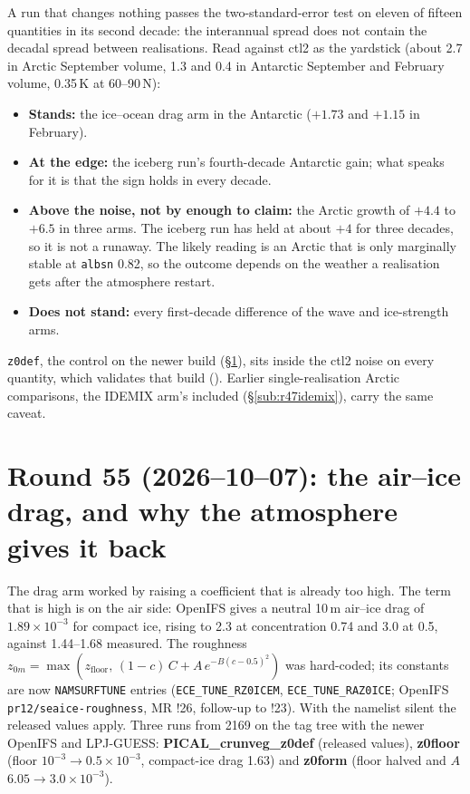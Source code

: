 \documentclass[10pt]{article}
\begin{document}
A run that changes nothing passes the two-standard-error test on eleven of fifteen quantities in its second decade: the interannual spread
does not contain the decadal spread between realisations. Read against ctl2 as the yardstick (about 2.7
in Arctic September volume, 1.3 and 0.4 in Antarctic September and February volume, 0.35\,K at
60--90\,N):

\begin{itemize}\itemsep2pt
\item \textbf{Stands:} the ice--ocean drag arm in the Antarctic ($+1.73$ and $+1.15$ in February).
\item \textbf{At the edge:} the iceberg run's fourth-decade Antarctic gain; what speaks for it is that
the sign holds in every decade.
\item \textbf{Above the noise, not by enough to claim:} the Arctic growth of $+4.4$ to $+6.5$ in three
arms. The iceberg run has held at about $+4$ for three decades, so it is not a runaway. The likely
reading is an Arctic that is only marginally stable at \texttt{albsn} 0.82, so the outcome depends on
the weather a realisation gets after the atmosphere restart.
\item \textbf{Does not stand:} every first-decade difference of the wave and ice-strength arms.
\end{itemize}

\noindent \texttt{z0def}, the control on the newer build (\S\ref{sec:round55}), sits inside the ctl2
noise on every quantity, which validates that build (). Earlier
single-realisation Arctic comparisons, the IDEMIX arm's included (\S\ref{sub:r47idemix}), carry the same
caveat.

\section{Round 55 (2026--10--07): the air--ice drag, and why the atmosphere gives it back}\label{sec:round55}

The drag arm worked by raising a coefficient that is already too high. The term that is high is on the
air side: OpenIFS gives a neutral 10\,m air--ice drag of $1.89\times10^{-3}$ for compact ice, rising to
2.3 at concentration 0.74 and 3.0 at 0.5, against 1.44--1.68 measured. The roughness
$z_{0m}=\max(z_\mathrm{floor},\,(1-c)\,C+A\,e^{-B(c-0.5)^2})$ was hard-coded; its constants are now
\texttt{NAMSURFTUNE} entries (\texttt{ECE\_TUNE\_RZ0ICEM}, \texttt{ECE\_TUNE\_RAZ0ICE}; OpenIFS
\texttt{pr12/seaice-roughness}, MR !26, follow-up to !23). With the namelist silent the released values
apply. Three runs from 2169 on the tag tree with the newer OpenIFS and LPJ-GUESS:
\textbf{PICAL\_crunveg\_z0def} (released values), \textbf{z0floor} (floor $10^{-3}\to0.5\times10^{-3}$,
compact-ice drag 1.63) and \textbf{z0form} (floor halved and $A$ $6.05\to3.0\times10^{-3}$).
\end{document}
